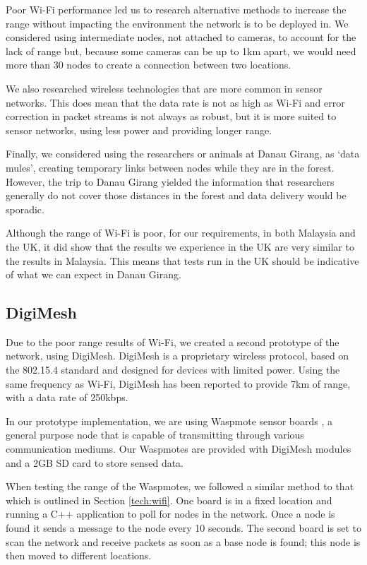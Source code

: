Poor Wi-Fi performance led us to research alternative methods to increase the range without impacting the environment the network is to be deployed in. We considered using intermediate nodes, not attached to cameras, to account for the lack of range but, because some cameras can be up to 1km apart, we would need more than 30 nodes to create a connection between two locations.
			
We also researched wireless technologies that are more common in sensor networks. This does mean that the data rate is not as high as Wi-Fi and error correction in packet streams is not always as robust, but it is more suited to sensor networks, using less power and providing longer range.
			
Finally, we considered using the researchers or animals at Danau Girang, as `data mules', creating temporary links between nodes while they are in the forest. However, the trip to Danau Girang yielded the information that researchers generally do not cover those distances in the forest and data delivery would be sporadic.
			
Although the range of Wi-Fi is poor, for our requirements, in both Malaysia and the UK, it did show that the results we experience in the UK are very similar to the results in Malaysia. This means that tests run in the UK should be indicative of what we can expect in Danau Girang.

\subsection{DigiMesh}\label{tech:range:digimesh}
		Due to the poor range results of Wi-Fi, we created a second prototype of the network, using DigiMesh. DigiMesh is a proprietary wireless protocol, based on the 802.15.4 standard and designed for devices with limited power. Using the same frequency as Wi-Fi, DigiMesh has been reported to provide 7km of range, with a data rate of 250kbps.
		
In our prototype implementation, we are using Waspmote sensor boards \cite{waspmote}, a general purpose node that is capable of transmitting through various communication mediums. Our Waspmotes are provided with DigiMesh modules and a 2GB SD card to store sensed data.
		
When testing the range of the Waspmotes, we followed a similar method to that which is outlined in Section \ref{tech:wifi}. One board is in a fixed location and running a C++ application to poll for nodes in the network. Once a node is found it sends a message to the node every 10 seconds. The second board is set to scan the network and receive packets as soon as a base node is found; this node is then moved to different locations.
			
